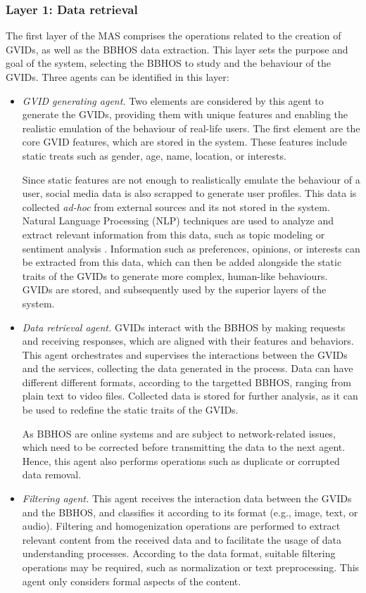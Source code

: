 \subsubsection*{Layer 1: Data retrieval}
The first layer of the MAS comprises the operations related to the creation of GVIDs, as well as the BBHOS data extraction. This layer sets the purpose and goal of the system, selecting the BBHOS to study and the behaviour of the GVIDs. Three agents can be identified in this layer:
\begin{itemize}
    \item \textit{GVID generating agent.} Two elements are considered by this agent to generate the GVIDs, providing them with unique features and enabling the realistic emulation of the behaviour of real-life users. The first element are the core GVID features, which are stored in the system. These features include static treats such as gender, age, name, location, or interests. 
    
    Since static features are not enough to realistically emulate the behaviour of a user, social media data is also scrapped to generate user profiles. This data is collected \textit{ad-hoc} from external sources and its not stored in the system. Natural Language Processing (NLP) techniques are used to analyze and extract relevant information from this data, such as topic modeling \citep{Alghamdi2015} or sentiment analysis \citep{sentimentanalysis}. Information such as preferences, opinions, or interests can be extracted from this data, which can then be added alongside the static traits of the GVIDs to generate more complex, human-like behaviours. GVIDs are stored, and subsequently used by the superior layers of the system. 
    
    \item \textit{Data retrieval agent.} GVIDs interact with the BBHOS by making requests and receiving responses, which are aligned with their features and behaviors. This agent orchestrates and supervises the interactions between the GVIDs and the services, collecting the data generated in the process. Data can have different different formats, according to the targetted BBHOS, ranging from plain text to video files. Collected data is stored for further analysis, as it can be used to redefine the static traits of the GVIDs.
    
    As BBHOS are online systems and are subject to network-related issues, which need to be corrected before transmitting the data to the next agent. Hence, this agent also performs operations such as duplicate or corrupted data removal. 
    
    \item \textit{Filtering agent.} This agent receives the interaction data between the GVIDs and the BBHOS, and classifies it according to its format (e.g., image, text, or audio). Filtering and homogenization operations are performed to extract relevant content from the received data and to facilitate the usage of data understanding processes. According to the data format, suitable filtering operations may be required, such as normalization or text preprocessing. This agent only considers formal aspects of the content.
\end{itemize}

